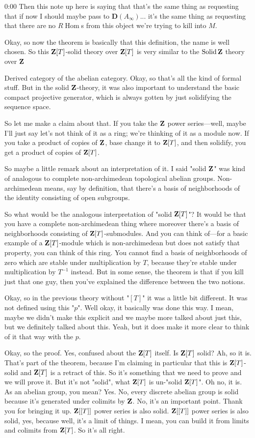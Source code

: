 \begin{unfinished}{0:00}
Then this note up here is saying that that's the same thing as requesting that if now I should maybe pass to $\mathbf{D}(A_\infty)$... it's the same thing as requesting that there are no $R\operatorname{Hom}$s from this object we're trying to kill into $M$.

Okay, so now the theorem is basically that this definition, the name is well chosen. So this $\mathbf Z[T]$-solid theory over $\mathbf Z[T]$ is very similar to the $\operatorname{Solid} \mathbf Z$ theory over $\mathbf Z$

Derived category of the abelian category. Okay, so that's all the kind of formal stuff. But in the solid $\mathbf Z$-theory, it was also important to understand the basic compact projective generator, which is always gotten by just solidifying the sequence space.

So let me make a claim about that. If you take the $\mathbf Z$ power series---well, maybe I'll just say let's not think of it as a ring; we're thinking of it as a module now. If you take a product of copies of $\mathbf Z$, base change it to $\mathbf Z[T]$, and then solidify, you get a product of copies of $\mathbf Z[T]$.

So maybe a little remark about an interpretation of it. I said "solid $\mathbf Z$" was kind of analogous to complete non-archimedean topological abelian groups. Non-archimedean means, say by definition, that there's a basis of neighborhoods of the identity consisting of open subgroups.

So what would be the analogous interpretation of "solid $\mathbf Z[T]$"? It would be that you have a complete non-archimedean thing where moreover there's a basis of neighborhoods consisting of $\mathbf Z[T]$-submodules. And you can think of---for a basic example of a $\mathbf Z[T]$-module which is non-archimedean but does not satisfy that property, you can think of this ring. You cannot find a basis of neighborhoods of zero which are stable under multiplication by $T$, because they're stable under multiplication by $T^{-1}$ instead. But in some sense, the theorem is that if you kill just that one guy, then you've explained the difference between the two notions.

Okay, so in the previous theory without "$[T]$" it was a little bit different. It was not defined using this "$p$". Well okay, it basically was done this way. I mean, maybe we didn't make this explicit and we maybe more talked about just this, but we definitely talked about this. Yeah, but it does make it more clear to think of it that way with the $p$.

Okay, so the proof. Yes, confused about the $\mathbf Z[T]$ itself. Is $\mathbf Z[T]$ solid? Ah, so it is. That's part of the theorem, because I'm claiming in particular that this is $\mathbf Z[T]$-solid and $\mathbf Z[T]$ is a retract of this. So it's something that we need to prove and we will prove it. But it's not "solid", what $\mathbf Z[T]$ is un-"solid $\mathbf Z[T]$". Oh no, it is. As an abelian group, you mean? Yes. No, every discrete abelian group is solid because it's generated under colimits by $\mathbf Z$. No, it's an important point. Thank you for bringing it up. $\mathbf Z[[T]]$ power series is also solid. $\mathbf Z[[T]]$ power series is also solid, yes, because well, it's a limit of things. I mean, you can build it from limits and colimits from $\mathbf Z[T]$. So it's all right.


\end{unfinished}
